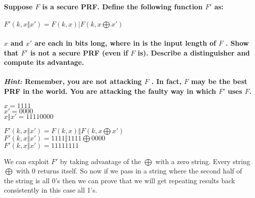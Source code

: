 \documentclass[letterpaper,12pt,notitlepage,fleqn]{article}
\begin{document}
\section{}
\textbf{Suppose $F$ is a secure PRF. Define the following function $F'$ as:\\ \\ $F'(k,x \Vert x')=F(k,x) \vert F(k,x \bigoplus x')$}\\\\
\textbf{$x$ and $x'$ are each in bits long, where in is the input length of $F$ . Show that $F'$ is \textbf{not} a secure PRF (even if $F$ is). Describe a distinguisher and compute its advantage.\\ \\
\textit{Hint:} Remember, you are not attacking $F$ . In fact, $F$ may be the best PRF in the world. You
are attacking the faulty way in which $F'$ uses $F$.}
\begin{multicols}{2}
\begin{center}
$x = 1111$ \\
$x' = 0000$ \\
$x \Vert x' = 11110000$
\end{center}
\columnbreak
$F'(k,x \Vert x')=F(k,x) \Vert F(k,x \bigoplus x')$ \\
$F'(k,x \Vert x')=1111 \Vert 1111 \bigoplus 0000$\\
$F'(k,x \Vert x')=1111 1111$
\end{multicols}
We can exploit $F'$ by taking advantage of the $\bigoplus$ with a zero string. Every string $\bigoplus$ with 0 returns itself. So now if we pass in a string where the second half of the string is all $0$'s then we can prove that we will get repeating results back consistently in this case all 1's.
	
\end{document}
